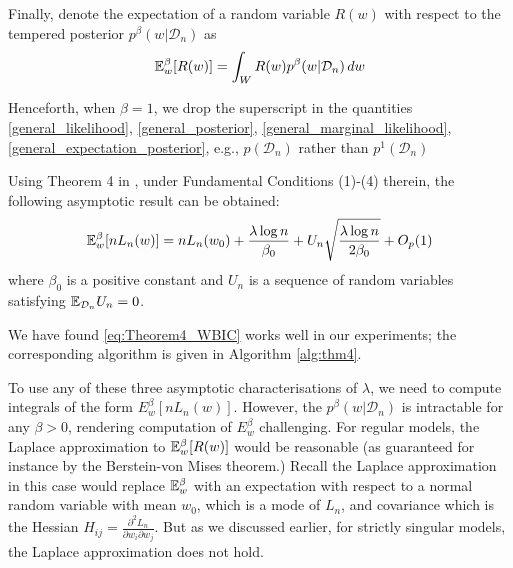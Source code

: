\documentclass{article} %
\begin{document}
Finally, denote the expectation of a random variable $R(w)$ with respect to the tempered posterior $p^\beta(w|\mathcal D_n)$ as
\begin{equation}
{\mathbb{E}}_w^\beta [R(w)] = \int_W R(w) p^\beta(w|\mathcal D_n) \,dw
\label{general_expectation_posterior}
\end{equation}

Henceforth, when $\beta = 1$, we drop the superscript in the quantities \ref{general_likelihood}, \ref{general_posterior}, \ref{general_marginal_likelihood}, \ref{general_expectation_posterior}, e.g., $p(\mathcal D_n)$ rather than $p^1(\mathcal D_n)$


Using Theorem 4 in \cite{watanabe_widely_2013}, under Fundamental Conditions (1)-(4) therein, the following asymptotic result can be obtained: 
\begin{equation}
    {\mathbb{E}}_w^\beta [nL_n(w)] = nL_n(w_0) + \frac{\lambda \log n}{\beta_0} + U_n \sqrt{\frac{\lambda \log n}{2 \beta_0}} + O_p(1)
    \label{eq:Theorem4_WBIC}
\end{equation}
where $\beta_0$ is a positive constant and $U_n$ is a sequence of random variables satisfying $\mathbb{E}_{\mathcal D_n} U_n = 0$. %

 We have found \eqref{eq:Theorem4_WBIC} works well in our experiments; the corresponding algorithm is given in Algorithm \ref{alg:thm4}. 

To use any of these three asymptotic characterisations of $\lambda$, we need to compute integrals of the form $E_w^\beta [n L_n(w)]$. However, the $p^\beta(w|\mathcal D_n)$ is intractable for any $\beta>0$, rendering computation of $E_w^\beta$ challenging. For regular models, the Laplace approximation to ${\mathbb{E}}_w^\beta [R(w)]$ would be reasonable (as guaranteed for instance by the Berstein-von Mises theorem.) Recall the Laplace approximation in this case would replace ${\mathbb{E}}_w^\beta$ with an expectation with respect to a normal random variable with mean $w_0$, which is a mode of $L_n$, and covariance which is the Hessian $H_{ij} =\frac{\partial^2 L_n}{\partial w_i \partial w_j}$. But as we discussed earlier, for strictly singular models, the Laplace approximation does not hold. 
\end{document}
